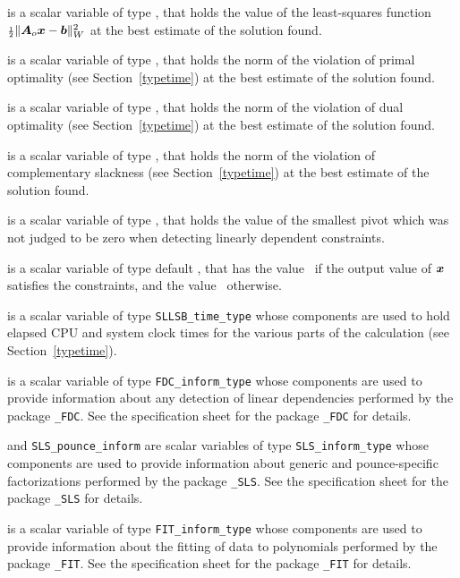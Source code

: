 \documentclass{galahad}
\newcommand{\packagename}{SLLSB}
\begin{document}
\begin{description}
 is a scalar variable of type \realdp, that holds the value of 
the least-squares function ${\scriptstyle \frac{1}{2}} \| {\bm{A}}_o {\bm{x}} - {\bm{b}}\|_W^2$ 
at the best estimate of the solution found.

 is a scalar variable of type \realdp,
that holds the norm of the violation of primal optimality
(see Section~\ref{typetime}) at the best estimate of the solution found.

 is a scalar variable of type \realdp,
that holds the norm of the violation of dual optimality
(see Section~\ref{typetime}) at the best estimate of the solution found.

is a scalar variable of type \realdp,
that holds the norm of the violation of complementary slackness
(see Section~\ref{typetime}) at the best estimate of the solution found.

is a scalar variable of type \realdp,
that holds the value of the smallest pivot which was not judged to be 
zero when detecting linearly dependent constraints.

 is a scalar variable of type default \logical, that has the
value \true\ if the output value of ${\bm{x}}$ satisfies the constraints,
and the value \false\ otherwise.

 is a scalar variable of type {\tt \packagename\_time\_type}
whose components are used to hold elapsed CPU and system clock times for the
various parts of the calculation (see Section~\ref{typetime}).

 is a scalar variable of type
{\tt FDC\_inform\_type}
whose components are used to provide information about
any detection of linear dependencies
performed by the package
{\tt \libraryname\_FDC}.
See the specification sheet for the package
{\tt \libraryname\_FDC} for details.

 and {\tt SLS\_pounce\_inform}
are scalar variables of type {\tt SLS\_inform\_type}
whose components are used to provide information about
generic and pounce-specific factorizations performed by the package
{\tt \libraryname\_SLS}.
See the specification sheet for the package
{\tt \libraryname\_SLS} for details.

 is a scalar variable of type
{\tt FIT\_inform\_type}
whose components are used to provide information about the fitting
of data to polynomials performed by the package
{\tt \libraryname\_FIT}.
See the specification sheet for the package
{\tt \libraryname\_FIT} for details.


\end{description}
\end{document}
